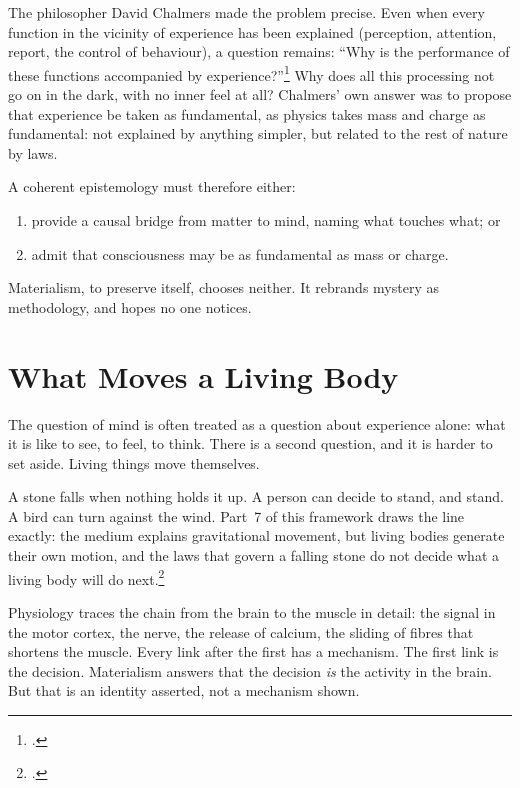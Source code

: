 \documentclass[11pt,a4paper]{article}
\newcommand{\fn}[1]{\footnote{\citealp{#1}.}}
\begin{document}
The philosopher David Chalmers made the problem precise. Even when every function in the vicinity of experience has been explained (perception, attention, report, the control of behaviour), a question remains: ``Why is the performance of these functions accompanied by experience?''\fn{chalmers1995} Why does all this processing not go on in the dark, with no inner feel at all? Chalmers' own answer was to propose that experience be taken as fundamental, as physics takes mass and charge as fundamental: not explained by anything simpler, but related to the rest of nature by laws.

A coherent epistemology must therefore either:
\begin{enumerate}
  \item provide a causal bridge from matter to mind, naming what touches what; or
  \item admit that consciousness may be as fundamental as mass or charge.
\end{enumerate}
Materialism, to preserve itself, chooses neither. It rebrands mystery as methodology, and hopes no one notices.

\section{What Moves a Living Body}
\label{sec:living}

The question of mind is often treated as a question about experience alone: what it is like to see, to feel, to think. There is a second question, and it is harder to set aside. Living things move themselves.

A stone falls when nothing holds it up. A person can decide to stand, and stand. A bird can turn against the wind. Part~7 of this framework draws the line exactly: the medium explains gravitational movement, but living bodies generate their own motion, and the laws that govern a falling stone do not decide what a living body will do next.\fn{rashadaPart7}

Physiology traces the chain from the brain to the muscle in detail: the signal in the motor cortex, the nerve, the release of calcium, the sliding of fibres that shortens the muscle. Every link after the first has a mechanism. The first link is the decision. Materialism answers that the decision \emph{is} the activity in the brain. But that is an identity asserted, not a mechanism shown. 
\end{document}
